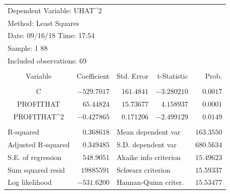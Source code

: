 \documentclass[12pt]{report}
\begin{document}
\begin{table}[H]
	\centering
	\begin{tabular}{lrrrr}
		\multicolumn{3}{l}{Dependent Variable: UHAT\textasciicircum 2}&\multicolumn{1}{c}{}&\multicolumn{1}{c}{}\\
		\multicolumn{3}{l}{Method: Least Squares}&\multicolumn{1}{c}{}&\multicolumn{1}{c}{}\\
		\multicolumn{3}{l}{Date: 09/16/18   Time: 17:54}&\multicolumn{1}{c}{}&\multicolumn{1}{c}{}\\
		\multicolumn{2}{l}{Sample: 1 88}&\multicolumn{1}{c}{}&\multicolumn{1}{c}{}&\multicolumn{1}{c}{}\\
		\multicolumn{3}{l}{Included observations: 69}&\multicolumn{1}{c}{}&\multicolumn{1}{c}{}\\
		[4.5pt] \hline \\ [-4.5pt]
		\multicolumn{1}{c}{Variable}&\multicolumn{1}{r}{Coefficient}&\multicolumn{1}{r}{Std. Error}&\multicolumn{1}{r}{t-Statistic}&\multicolumn{1}{r}{Prob.}\\
		[4.5pt] \hline \\ [-4.5pt]
		\multicolumn{1}{c}{C}&\multicolumn{1}{r}{$-529.7017$}&\multicolumn{1}{r}{$161.4841$}&\multicolumn{1}{r}{$-3.280210$}&\multicolumn{1}{r}{$0.0017$}\\
		\multicolumn{1}{c}{PROFITHAT}&\multicolumn{1}{r}{$65.44824$}&\multicolumn{1}{r}{$15.73677$}&\multicolumn{1}{r}{$4.158937$}&\multicolumn{1}{r}{$0.0001$}\\
		\multicolumn{1}{c}{PROFITHAT\textasciicircum 2}&\multicolumn{1}{r}{$-0.427865$}&\multicolumn{1}{r}{$0.171206$}&\multicolumn{1}{r}{$-2.499129$}&\multicolumn{1}{r}{$0.0149$}\\
		[4.5pt] \hline \\ [-4.5pt]
		\multicolumn{1}{l}{R-squared}&\multicolumn{1}{r}{$0.368618$}&\multicolumn{2}{l}{Mean dependent var}&\multicolumn{1}{r}{$163.3550$}\\
		\multicolumn{1}{l}{Adjusted R-squared}&\multicolumn{1}{r}{$0.349485$}&\multicolumn{2}{l}{S.D. dependent var}&\multicolumn{1}{r}{$680.5634$}\\
		\multicolumn{1}{l}{S.E. of regression}&\multicolumn{1}{r}{$548.9051$}&\multicolumn{2}{l}{Akaike info criterion}&\multicolumn{1}{r}{$15.49623$}\\
		\multicolumn{1}{l}{Sum squared resid}&\multicolumn{1}{r}{$19885591$}&\multicolumn{2}{l}{Schwarz criterion}&\multicolumn{1}{r}{$15.59337$}\\
		\multicolumn{1}{l}{Log likelihood}&\multicolumn{1}{r}{$-531.6200$}&\multicolumn{2}{l}{Hannan-Quinn criter.}&\multicolumn{1}{r}{$15.53477$}\\

\end{tabular}
\end{table}
\end{document}
